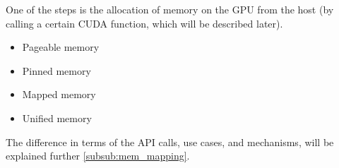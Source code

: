 One of the steps is the allocation of 
memory on the GPU from the host (by calling a certain CUDA function, which will be described later). 
\begin{itemize}
\setlength\itemsep{-0.1em}
   \item Pageable memory
   \item Pinned memory
   \item Mapped memory
   \item Unified memory
\end{itemize}
The difference in terms of the API calls, use cases, and mechanisms, will be explained further \autoref{subsub:mem_mapping}. 




